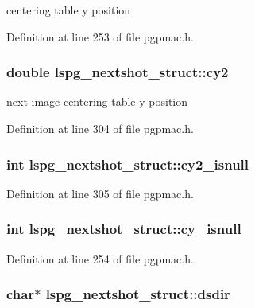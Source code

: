 centering table y position 



Definition at line 253 of file pgpmac.\-h.

\hypertarget{structlspg__nextshot__struct_a3644e5c3f12af18a3b426d4d4d7e16a5}{
\subsubsection[{cy2}]{\setlength{\rightskip}{0pt plus 5cm}double lspg\-\_\-nextshot\-\_\-struct\-::cy2}}\label{structlspg__nextshot__struct_a3644e5c3f12af18a3b426d4d4d7e16a5}


next image centering table y position 



Definition at line 304 of file pgpmac.\-h.

\hypertarget{structlspg__nextshot__struct_a57d78a389413827302df6ebe3dcb3c89}{
\subsubsection[{cy2\-\_\-isnull}]{\setlength{\rightskip}{0pt plus 5cm}int lspg\-\_\-nextshot\-\_\-struct\-::cy2\-\_\-isnull}}\label{structlspg__nextshot__struct_a57d78a389413827302df6ebe3dcb3c89}


Definition at line 305 of file pgpmac.\-h.

\hypertarget{structlspg__nextshot__struct_a3895d645420848aed05b95694ec8c6c7}{
\subsubsection[{cy\-\_\-isnull}]{\setlength{\rightskip}{0pt plus 5cm}int lspg\-\_\-nextshot\-\_\-struct\-::cy\-\_\-isnull}}\label{structlspg__nextshot__struct_a3895d645420848aed05b95694ec8c6c7}


Definition at line 254 of file pgpmac.\-h.

\hypertarget{structlspg__nextshot__struct_ac372e1774a25b3d4bfbb9169762eb39e}{
\subsubsection[{dsdir}]{\setlength{\rightskip}{0pt plus 5cm}char$\ast$ lspg\-\_\-nextshot\-\_\-struct\-::dsdir}}\label{structlspg__nextshot__struct_ac372e1774a25b3d4bfbb9169762eb39e}


